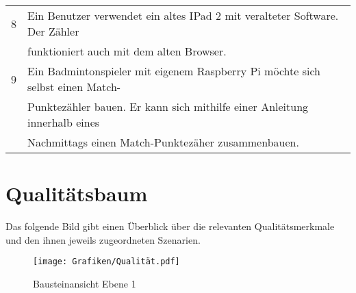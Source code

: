\begin{center}
\begin{tabular}[h]{|l|l|}
\cline{1-2}
8 & Ein Benutzer verwendet ein altes IPad 2 mit veralteter Software. Der Zähler\\&funktioniert auch mit dem alten Browser.\\ 
\cline{1-2}
9 & Ein Badmintonspieler mit eigenem Raspberry Pi möchte sich selbst einen Match-\\&Punktezähler bauen. Er kann sich mithilfe einer Anleitung innerhalb eines\\&Nachmittags einen Match-Punktezäher zusammenbauen. \\ 
\cline{1-2}
\end{tabular}
\end{center}
\section{Qualitätsbaum}
Das folgende Bild gibt einen Überblick über die relevanten Qualitätsmerkmale und den ihnen jeweils zugeordneten Szenarien. 

\begin{figure}[h]
\begin{center}
\texttt{[image: Grafiken/Qualität.pdf]}
\caption{Bausteinansicht Ebene 1}
\end{center}
\end{figure}